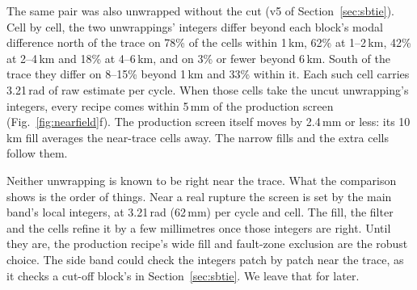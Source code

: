 The same pair was also unwrapped without the cut (v5 of Section~\ref{sec:sbtie}). Cell by cell, the two unwrappings'
integers differ beyond each block's modal difference north of the trace on 78\% of the cells within 1\,km, 62\% at
1--2\,km, 42\% at 2--4\,km and 18\% at 4--6\,km, and on 3\% or fewer beyond 6\,km. South of the trace they differ on
8--15\% beyond 1\,km and 33\% within it. Each such cell carries 3.21\,rad of raw estimate per cycle. When those cells
take the uncut unwrapping's integers, every recipe comes within 5\,mm of the production screen
(Fig.~\ref{fig:nearfield}f). The production screen itself moves by 2.4\,mm or less: its 10\,km fill averages the
near-trace cells away. The narrow fills and the extra cells follow them.

Neither unwrapping is known to be right near the trace. What the comparison shows is the order of things. Near a real
rupture the screen is set by the main band's local integers, at 3.21\,rad (62\,mm) per cycle and cell. The fill, the
filter and the cells refine it by a few millimetres once those integers are right. Until they are, the production
recipe's wide fill and fault-zone exclusion are the robust choice. The side band could check the integers patch by
patch near the trace, as it checks a cut-off block's in Section~\ref{sec:sbtie}. We leave that for later.

\begin{table}[t]
\centering
\caption{The near-trace recipe, one change at a time, on the through-going synthetic rupture at 4\,m of slip (mean
of five noise realizations): error rms in mm of LOS within 0--2, 2--5 and 5--10\,km of the trace, and the error's
2--4\,km step across it. Left: the Okada field alone. Right: with rough near-field deformation as large as D141's
(median 16--21\,rad/km within 1\,km of the trace). The error beyond 20\,km is 1.3\,mm with the first-order filter
and 2.1\,mm without it. The main band is the truth's.}
\label{tab:nearfield}
\setlength{\tabcolsep}{4pt}

\end{table}

\begin{table}[t]
\centering
\caption{The fills, rms error in mm of LOS. Synthetic ionospheres (eight of each, 0.7\,rad of noise per cell): inside
a 2\,km fault zone, and 4--8\,km into a one-sided 12\,km strip. Real ionosphere (34 windows of 100\,km in eight NISAR
screens, against the same filter on all the data): inside fake fault zones of half-width 1, 2 and 4\,km, and in a
one-sided strip.}
\label{tab:fill}
\small
\setlength{\tabcolsep}{3.5pt}

\end{table}

